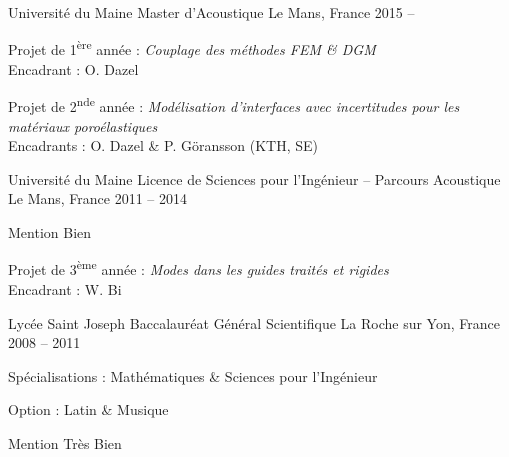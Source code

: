 

\begin{cventries}

  \cventry
    {Université du Maine} %
		{Master d'Acoustique} %
    {Le Mans, France} %
    {2015 -- } %
    {
      \begin{cvitems} %
				\item {Projet de 1\textsuperscript{ère} année : \textit{Couplage des méthodes FEM \& DGM}\\
					Encadrant : O. Dazel}
				\item {Projet de 2\textsuperscript{nde} année : \textit{Modélisation d'interfaces avec incertitudes pour les matériaux poroélastiques}
					\\Encadrants : O. Dazel \& P. Göransson (KTH, SE)}
      \end{cvitems}
    }

  \cventry
    {Université du Maine} %
		{Licence de Sciences pour l'Ingénieur -- Parcours Acoustique} %
    {Le Mans, France} %
    {2011 -- 2014} %
    {
      \begin{cvitems} %
        \item {Mention Bien}
				\item {Projet de 3\textsuperscript{ème} année : \textit{Modes dans les guides traités et rigides}
					\\Encadrant : W. Bi}
      \end{cvitems}
    }

  \cventry
    {Lycée Saint Joseph} %
		{Baccalauréat Général Scientifique} %
    {La Roche sur Yon, France} %
    {2008 -- 2011} %
    {
      \begin{cvitems} %
				\item {Spécialisations : Mathématiques \& Sciences pour l'Ingénieur}
				\item {Option : Latin \& Musique}
        \item {Mention Très Bien}
      \end{cvitems}
    }
\end{cventries}
